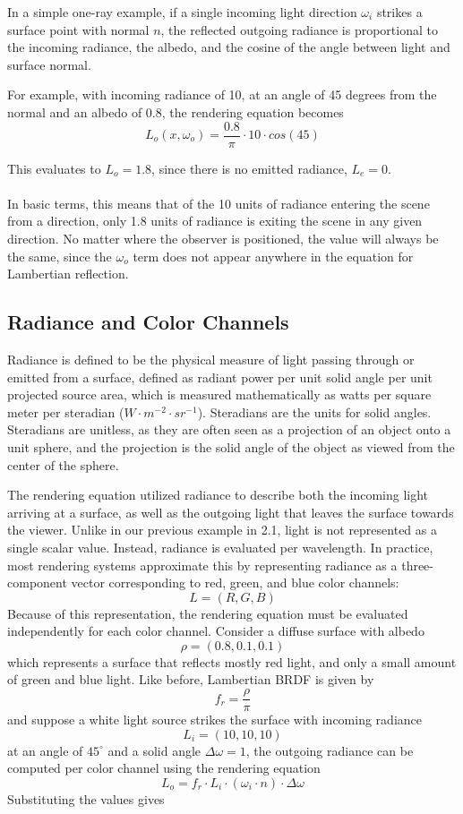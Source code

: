 \documentclass[12pt]{article}
\begin{document}
In a simple one-ray example, if a single incoming light direction $\omega_i$ strikes a surface point with normal $n$, the reflected outgoing radiance is proportional to the incoming radiance, the albedo, and the cosine of the angle between light and surface normal. 

For example, with incoming radiance of 10, at an angle of 45 degrees from the normal and an albedo of 0.8, the rendering equation becomes 
\[
L_o(x, \omega_o) = \frac{0.8}{\pi} \cdot 10 \cdot cos(45)
\]

This evaluates to $L_o = 1.8$, since there is no emitted radiance, $L_e = 0$.
\\\\
In basic terms, this means that of the 10 units of radiance entering the scene from a direction, only 1.8 units of radiance is exiting the scene in any given direction. No matter where the observer is positioned, the value will always be the same, since the $\omega_o$ term does not appear anywhere in the equation for Lambertian reflection.


\subsection{Radiance and Color Channels}

Radiance is defined to be the physical measure of light passing through or emitted from a surface, defined as radiant power per unit solid angle per unit projected source area, which is measured mathematically as watts per square meter per steradian ($W \cdot m^{-2} \cdot sr^{-1}$). Steradians are the units for solid angles. Steradians are unitless, as they are often seen as a projection of an object onto a unit sphere, and the projection is the solid angle of the object as viewed from the center of the sphere.

The rendering equation utilized radiance to describe both the incoming light arriving at a surface, as well as the outgoing light that leaves the surface towards the viewer. Unlike in our previous example in 2.1, light is not represented as a single scalar value. Instead, radiance is evaluated per wavelength. In practice, most rendering systems approximate this by representing radiance as a three-component vector corresponding to red, green, and blue color channels:   
\[
L = (R, G, B)
\]
Because of this representation, the rendering equation must be evaluated independently for each color channel. 
\newline\newline
Consider a diffuse surface with albedo 
\[
\rho = (0.8, 0.1, 0.1)
\]
which represents a surface that reflects mostly red light, and only a small amount of green and blue light. Like before, Lambertian BRDF is given by 
\[
f_r = \frac{\rho}{\pi}
\]
and suppose a white light source strikes the surface with incoming radiance 
\[
L_i = (10,10,10)
\]
at an angle of \(45^\circ\) and a solid angle \(\Delta\omega = 1\), the outgoing radiance can be computed per color channel using the rendering equation 
\[
L_o = f_r \cdot L_i \cdot (\omega_i \cdot n) \cdot \Delta\omega
\]
Substituting the values gives
\end{document}
